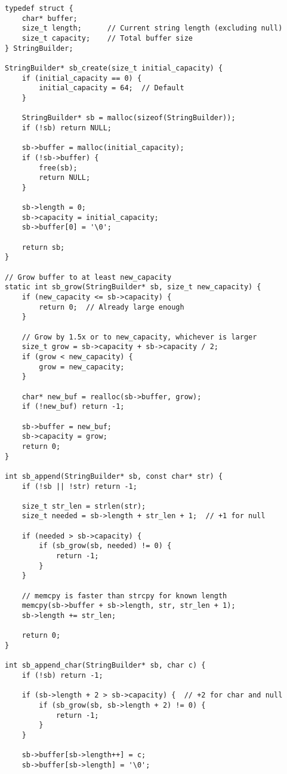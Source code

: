 \begin{lstlisting}
typedef struct {
    char* buffer;
    size_t length;      // Current string length (excluding null)
    size_t capacity;    // Total buffer size
} StringBuilder;

StringBuilder* sb_create(size_t initial_capacity) {
    if (initial_capacity == 0) {
        initial_capacity = 64;  // Default
    }

    StringBuilder* sb = malloc(sizeof(StringBuilder));
    if (!sb) return NULL;

    sb->buffer = malloc(initial_capacity);
    if (!sb->buffer) {
        free(sb);
        return NULL;
    }

    sb->length = 0;
    sb->capacity = initial_capacity;
    sb->buffer[0] = '\0';

    return sb;
}

// Grow buffer to at least new_capacity
static int sb_grow(StringBuilder* sb, size_t new_capacity) {
    if (new_capacity <= sb->capacity) {
        return 0;  // Already large enough
    }

    // Grow by 1.5x or to new_capacity, whichever is larger
    size_t grow = sb->capacity + sb->capacity / 2;
    if (grow < new_capacity) {
        grow = new_capacity;
    }

    char* new_buf = realloc(sb->buffer, grow);
    if (!new_buf) return -1;

    sb->buffer = new_buf;
    sb->capacity = grow;
    return 0;
}

int sb_append(StringBuilder* sb, const char* str) {
    if (!sb || !str) return -1;

    size_t str_len = strlen(str);
    size_t needed = sb->length + str_len + 1;  // +1 for null

    if (needed > sb->capacity) {
        if (sb_grow(sb, needed) != 0) {
            return -1;
        }
    }

    // memcpy is faster than strcpy for known length
    memcpy(sb->buffer + sb->length, str, str_len + 1);
    sb->length += str_len;

    return 0;
}

int sb_append_char(StringBuilder* sb, char c) {
    if (!sb) return -1;

    if (sb->length + 2 > sb->capacity) {  // +2 for char and null
        if (sb_grow(sb, sb->length + 2) != 0) {
            return -1;
        }
    }

    sb->buffer[sb->length++] = c;
    sb->buffer[sb->length] = '\0';


\end{lstlisting}
